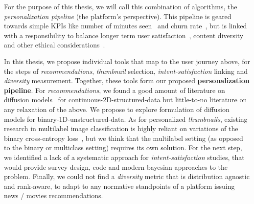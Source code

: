 For the purpose of this thesis, we will call this combination of algorithms, the \emph{personalization pipeline} (the platform's perspective). This pipeline is geared towards simple KPIs like number of minutes seen~\cite{spotifyIntent} and churn rate~\cite{oldChurn}, but is linked with a responsibility to balance longer term user satisfaction~\cite{longTerm}, content diversity and other ethical considerations~\cite{helberger}.




In this thesis, we propose individual tools that map to the user journey above, for the steps of \emph{recommendations}, \emph{thumbnail} selection, \emph{intent-satisfaction} linking and \emph{diversity} measurement. Together, these tools form our proposed \textbf{personalization pipeline}. For \emph{recommendations}, we found a good amount of literature on diffusion models~\cite{jascha} for continuous-2D-structured-data but little-to-no literature on any relaxation of the above. We propose to explore formulation of diffusion models for binary-1D-unstructured-data. As for personalized \emph{thumbnails}, existing research in multilabel image classification is highly reliant on variations of the binary cross-entropy loss~\cite{fisher}, but we think that the multilabel setting (as opposed to the binary or multiclass setting) requires its own solution. For the next step, we identified a lack of a systematic approach for \emph{intent-satisfaction} studies, that would provide survey design, code and modern bayesian approaches to the problem. Finally, we could not find a \emph{diversity} metric that is distribution agnostic and rank-aware, to adapt to any normative standpoints of a platform issuing news / movies recommendations.





